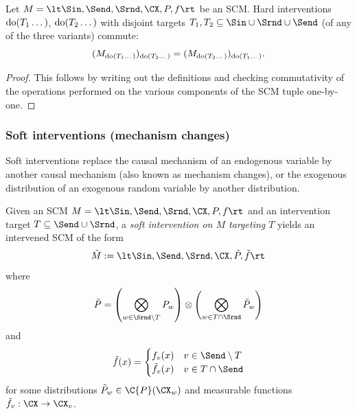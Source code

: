 \begin{Prp}\label{prp:hard_interventions_commute}
Let $M = \lt \Sin, \Send, \Srnd, \CX, P, f \rt$ be an SCM.
Hard interventions $\operatorname{do}(T_1\dots)$, $\operatorname{do}(T_2\dots)$ with disjoint targets $T_1, T_2 \subseteq \Sin \cup \Srnd \cup \Send$ (of any of the three variants) commute:
  $$(M_{\operatorname{do}(T_1\dots)})_{\operatorname{do}(T_2\dots)} = (M_{\operatorname{do}(T_2\dots)})_{\operatorname{do}(T_1\dots)}.$$
\end{Prp}
\begin{proof}
  This follows by writing out the definitions and checking commutativity of
  the operations performed on the various components of the SCM tuple one-by-one.
\end{proof}



\subsubsection{Soft interventions (mechanism changes)}

Soft interventions replace the causal mechanism of an endogenous variable by another causal mechanism (also known as mechanism changes),
or the exogenous distribution of an exogenous random variable by another distribution.

\begin{Def}\label{def:scm_soft_intervention}
  Given an SCM $M = \lt \Sin, \Send, \Srnd, \CX, P, f \rt$
  and an intervention target $T \subseteq \Send \cup \Srnd$, a \emph{soft intervention on $M$ targeting $T$}
  yields an intervened SCM of the form
  $$\tilde{M} := \lt \Sin,\Send,\Srnd,\CX,\tilde{P},\tilde{f} \rt$$
  where
  $$\tilde{P} = \lp\bigotimes_{w \in \Srnd \sm T} P_w \rp \otimes \lp \bigotimes_{w \in T \cap \Srnd} \tilde{P}_w \rp$$
  and
  $$\tilde{f}(x) = \begin{cases} 
      f_v(x) & v \in \Send\sm T \\
      \tilde{f}_v(x) & v \in T \cap \Send \\
  \end{cases}$$
  for some distributions $\tilde{P}_w \in \C{P}(\CX_w)$ and measurable functions $\tilde{f}_v : \CX \to \CX_v$.
\end{Def}

